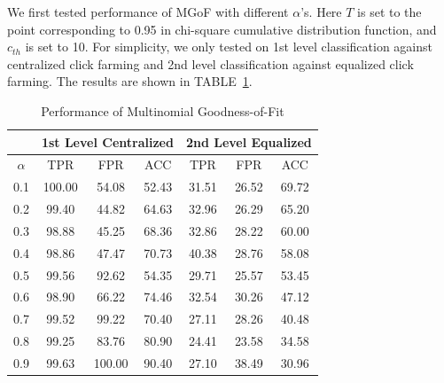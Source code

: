 \documentclass[10pt,conference,letterpaper]{IEEEtran}
\begin{document}
			We first tested performance of MGoF with different $\alpha$'s. Here $T$ is set to the point corresponding to 0.95 in chi-square cumulative distribution function, and $c_{th}$ is set to 10. For simplicity, we only tested on 1st level classification against centralized click farming and 2nd level classification against equalized click farming. 
			The results are shown in TABLE~\ref{tab:mgof}.
			
			\begin{table}[!ht]
				\centering
				\caption{Performance of Multinomial Goodness-of-Fit}
				\label{tab:mgof}
				\begin{tabular}{|c|c|c|c|c|c|c|}
					\hline
					& \multicolumn{3}{c|}{1st Level Centralized} & \multicolumn{3}{c|}{2nd Level Equalized}\\
					\hline 
					$\alpha$ & TPR & FPR & ACC & TPR & FPR & ACC \\ 
					\hline 
					0.1 & 100.00 & 54.08 & 52.43 & 31.51 & 26.52 & 69.72 \\ 
					\hline 
					0.2 & 99.40 & 44.82 & 64.63 & 32.96 & 26.29 & 65.20 \\ 
					\hline 
					0.3 & 98.88 & 45.25 & 68.36 & 32.86 & 28.22 & 60.00 \\ 
					\hline 
					0.4 & 98.86 & 47.47 & 70.73 & 40.38 & 28.76 & 58.08 \\ 
					\hline 
					0.5 & 99.56 & 92.62 & 54.35 & 29.71 & 25.57 & 53.45 \\ 
					\hline 
					0.6 & 98.90 & 66.22 & 74.46 & 32.54 & 30.26 & 47.12 \\ 
					\hline 
					0.7 & 99.52 & 99.22 & 70.40 & 27.11 & 28.26 & 40.48 \\ 
					\hline 
					0.8 & 99.25 & 83.76 & 80.90 & 24.41 & 23.58 & 34.58 \\ 
					\hline 
					0.9 & 99.63 & 100.00 & 90.40 & 27.10 & 38.49 & 30.96 \\ 
					\hline 
				\end{tabular} 
			\end{table}
		
\end{document}
